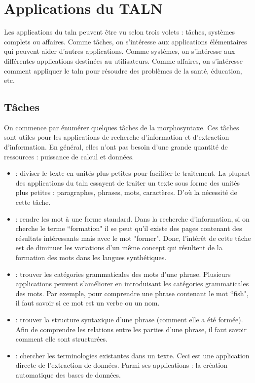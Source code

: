 \documentclass{KodeBook}
\begin{document}
\section{Applications du TALN}

Les applications du \ac{taln} peuvent être vu selon trois volets : tâches, systèmes complets ou affaires. 
Comme tâches, on s'intéresse aux applications élémentaires qui peuvent aider d'autres applications. 
Comme systèmes, on s'intéresse aux différentes applications destinées au utilisateurs. 
Comme affaires, on s'intéresse comment appliquer le \ac{taln} pour résoudre des problèmes de la santé, éducation, etc.

\subsection{Tâches}

On commence par énumérer quelques tâches de la morphosyntaxe. 
Ces tâches sont utiles pour les applications de recherche d'information et d'extraction d'information. 
En général, elles n'ont pas besoin d'une grande quantité de ressources : puissance de calcul et données.
\begin{itemize}
	\item {} : diviser le texte en unités plus petites pour faciliter le traitement. 
	La plupart des applications du \ac{taln} essayent de traiter un texte sous forme des unités plus petites : paragraphes, phrases, mots, caractères.
	D'où la nécessité de cette tâche.
	\item {} : rendre les mot à une forme standard. 
	Dans la recherche d'information, si on cherche le terme ``formation" il se peut qu'il existe des pages contenant des résultats intéressants mais avec le mot "former". 
	Donc, l'intérêt de cette tâche est de diminuer les variations d'un même concept qui résultent de la formation des mots dans les langues synthétiques.
	\item {} : trouver les catégories grammaticales des mots d'une phrase. 
	Plusieurs applications peuvent s'améliorer en introduisant les catégories grammaticales des mots. 
	Par exemple, pour comprendre une phrase contenant le mot ``fish", il faut savoir si ce mot est un verbe ou un nom.
	\item {} : trouver la structure syntaxique d'une phrase (comment elle a été formée).
	Afin de comprendre les relations entre les parties d'une phrase, il faut savoir comment elle sont structurées.
	\item {} : chercher les terminologies existantes dans un texte. 
	Ceci est une application directe de l'extraction de données. 
	Parmi ses applications : la création automatique des bases de données.
\end{itemize}
\end{document}
